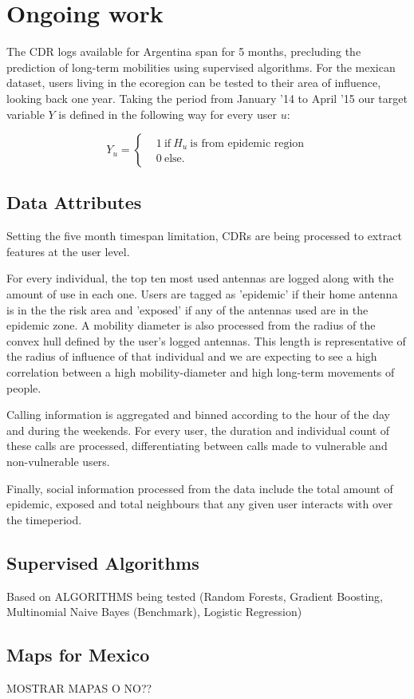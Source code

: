 \section{Ongoing work}

The CDR logs available for Argentina span for 5 months, precluding the prediction of long-term mobilities using supervised algorithms. For the mexican dataset, users living in the ecoregion can be tested to their area of influence, looking back one year. Taking the period from January '14 to April '15 our target variable $Y $ is defined in the following way for every user $u$: 

\[
    Y_u =
      \begin{cases}
        &1 \ \mbox{if} \ H_u \ \mbox{is from epidemic region}\\
        &0 \ \mbox{else}.
      \end{cases}
    \]
    
\subsection{Data Attributes}
Setting the five month timespan limitation, CDRs are being processed to extract features at the user level. 

For every individual, the top ten most used antennas are logged along with the amount of use in each one. Users are tagged as 'epidemic' if their home antenna is in the the risk area and 'exposed' if any of the antennas used are in the epidemic zone. A mobility diameter is also processed from the radius of the convex hull defined by the user's logged antennas. This length is representative of the radius of influence of that individual and we are expecting to see a high correlation between a high mobility-diameter and high long-term movements of people.

Calling information is aggregated and binned according to the hour of the day and during the weekends. For every user, the duration and individual count of these calls are processed, differentiating between calls made to vulnerable and non-vulnerable users. 

Finally, social information processed from the data include the total amount of epidemic, exposed and total neighbours that any given user interacts with over the timeperiod. 

\subsection{Supervised Algorithms}
Based on 
ALGORITHMS being tested (Random Forests, Gradient Boosting, Multinomial Naive Bayes (Benchmark), Logistic Regression)


\subsection{Maps for Mexico}
MOSTRAR MAPAS O NO??